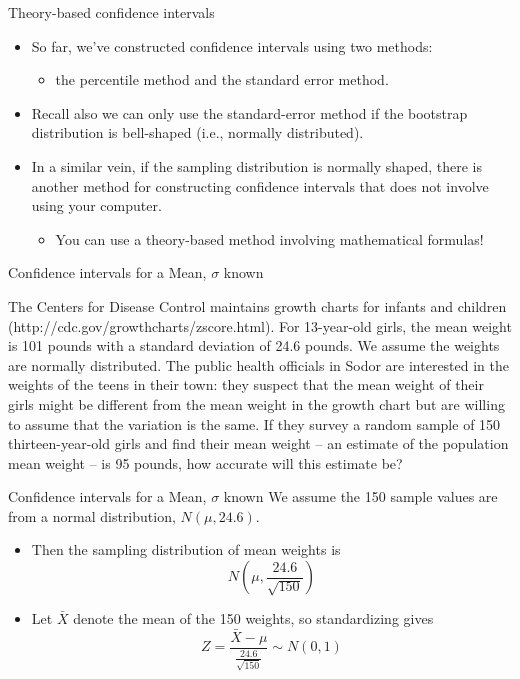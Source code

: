 \documentclass[
  ignorenonframetext,
]{beamer}
\providecommand{\tightlist}{%
  \setlength{\itemsep}{0pt}\setlength{\parskip}{0pt}}
\begin{document}
\begin{frame}{Theory-based confidence intervals}
\protect\hypertarget{theory-based-confidence-intervals-1}{}
\begin{itemize}
\item
  So far, we've constructed confidence intervals using two methods:

  \begin{itemize}
  \tightlist
  \item
    the percentile method and the standard error method.
  \end{itemize}
\item
  Recall also we can only use the standard-error method if the bootstrap
  distribution is bell-shaped (i.e., normally distributed).
\item
  In a similar vein, if the sampling distribution is normally shaped,
  there is another method for constructing confidence intervals that
  does not involve using your computer.

  \begin{itemize}
  \tightlist
  \item
    You can use a theory-based method involving mathematical formulas!
  \end{itemize}
\end{itemize}
\end{frame}

\begin{frame}{Confidence intervals for a Mean, \(\sigma\) known}
\protect\hypertarget{confidence-intervals-for-a-mean-sigma-known}{}
\begin{tcolorbox}
The Centers for Disease Control maintains growth charts for infants and children (http://cdc.gov/growthcharts/zscore.html). For 13-year-old girls, the mean weight is 101 pounds with a standard deviation of 24.6 pounds. We assume the weights are normally distributed. The public health officials in Sodor are interested in the weights of the teens in their town: they suspect that the mean weight of their girls might be different from the mean weight in the growth chart but are willing to assume that the variation is the same. If they survey a random sample of 150 thirteen-year-old girls and find their mean weight – an estimate of the population mean weight – is 95 pounds, how accurate will this estimate be?
\end{tcolorbox}
\end{frame}

\begin{frame}{Confidence intervals for a Mean, \(\sigma\) known}
\protect\hypertarget{confidence-intervals-for-a-mean-sigma-known-1}{}
We assume the 150 sample values are from a normal distribution,
\(N(\mu, 24.6)\).

\begin{itemize}
\item
  Then the sampling distribution of mean weights is
  \[N(\mu,\frac{24.6}{\sqrt{150}})\]
\item
  Let \(\bar{X}\) denote the mean of the 150 weights, so standardizing
  gives \[Z=\frac{\bar{X}-\mu}{\frac{24.6}{\sqrt{150}}}\sim N(0,1)\]
\end{itemize}
\end{frame}
\end{document}
